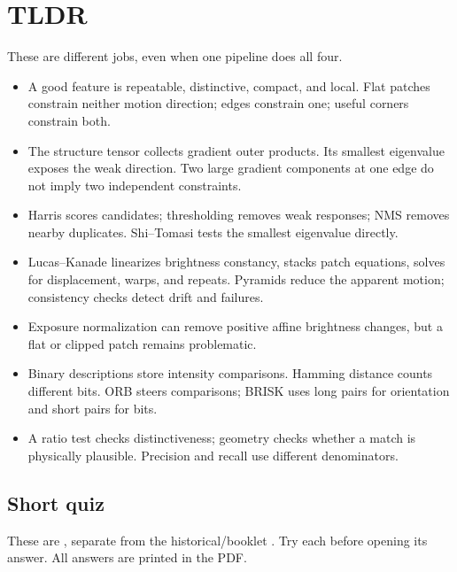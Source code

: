 \documentclass[letterpaper,11pt,english,openany,oneside]{jupyterBook}
\begin{document}
\section{TLDR}
\label{\detokenize{lectures/lecture05/tldr:tldr}}\label{\detokenize{lectures/lecture05/tldr:lec05-tldr}}\label{\detokenize{lectures/lecture05/tldr::doc}}
\sphinxAtStartPar
{} These are different jobs, even when one pipeline does all four.
\begin{itemize}
\item {}
\sphinxAtStartPar
A good feature is repeatable, distinctive, compact, and local. Flat patches constrain neither motion direction; edges constrain one; useful corners constrain both.

\item {}
\sphinxAtStartPar
The structure tensor collects gradient outer products. Its smallest eigenvalue exposes the weak direction. Two large gradient components at one edge do not imply two independent constraints.

\item {}
\sphinxAtStartPar
Harris scores candidates; thresholding removes weak responses; NMS removes nearby duplicates. Shi–Tomasi tests the smallest eigenvalue directly.

\item {}
\sphinxAtStartPar
Lucas–Kanade linearizes brightness constancy, stacks patch equations, solves for displacement, warps, and repeats. Pyramids reduce the apparent motion; consistency checks detect drift and failures.

\item {}
\sphinxAtStartPar
Exposure normalization can remove positive affine brightness changes, but a flat or clipped patch remains problematic.

\item {}
\sphinxAtStartPar
Binary descriptions store intensity comparisons. Hamming distance counts different bits. ORB steers comparisons; BRISK uses long pairs for orientation and short pairs for bits.

\item {}
\sphinxAtStartPar
A ratio test checks distinctiveness; geometry checks whether a match is physically plausible. Precision and recall use different denominators.

\end{itemize}


\subsection{Short quiz}
\label{\detokenize{lectures/lecture05/tldr:short-quiz}}
\sphinxAtStartPar
These are , separate from the historical/booklet {\hyperref[\detokenize{lectures/lecture05/quiz-workbook::doc}]{}}. Try each before opening its answer. All answers are printed in the PDF.
\end{document}
